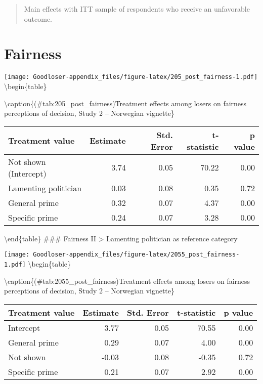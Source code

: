 \documentclass[
]{book}
\begin{document}
\begin{quote}
Main effects with ITT sample of respondents who receive an unfavorable outcome.
\end{quote}

\hypertarget{fairness-5}{%
\section{Fairness}\label{fairness-5}}

\texttt{[image: Goodloser-appendix\_files/figure-latex/205\_post\_fairness-1.pdf]} \textbackslash begin\{table\}

\textbackslash caption\{(\#tab:205\_post\_fairness)Treatment effects among losers on fairness perceptions of decision, Study 2 -- Norwegian vignette\}
\centering

\begin{tabular}[t]{lrrrr}
\toprule
Treatment value & Estimate & Std. Error & t-statistic & p value\\
\midrule
Not shown (Intercept) & 3.74 & 0.05 & 70.22 & 0.00\\
Lamenting politician & 0.03 & 0.08 & 0.35 & 0.72\\
General prime & 0.32 & 0.07 & 4.37 & 0.00\\
Specific prime & 0.24 & 0.07 & 3.28 & 0.00\\
\bottomrule
\end{tabular}

\textbackslash end\{table\}
\#\#\# Fairness II
\textgreater{} Lamenting politician as reference category

\texttt{[image: Goodloser-appendix\_files/figure-latex/2055\_post\_fairness-1.pdf]} \textbackslash begin\{table\}

\textbackslash caption\{(\#tab:2055\_post\_fairness)Treatment effects among losers on fairness perceptions of decision, Study 2 -- Norwegian vignette\}
\centering

\begin{tabular}[t]{lrrrr}
\toprule
Treatment value & Estimate & Std. Error & t-statistic & p value\\
\midrule
Intercept & 3.77 & 0.05 & 70.55 & 0.00\\
General prime & 0.29 & 0.07 & 4.00 & 0.00\\
Not shown & -0.03 & 0.08 & -0.35 & 0.72\\
Specific prime & 0.21 & 0.07 & 2.92 & 0.00\\
\bottomrule
\end{tabular}
\end{document}
